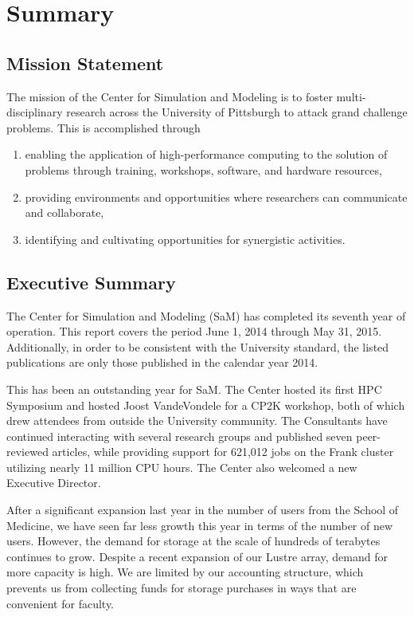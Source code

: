 \chapter{Summary}
\section{Mission Statement}

The mission of the Center for Simulation and Modeling is to foster multi-disciplinary research across the University of Pittsburgh to attack grand
challenge problems.  This is accomplished through

\begin{enumerate}
    \item enabling the application of high-performance computing to the
	  solution of problems through training, workshops, software, and
          hardware resources,
    \item providing environments and opportunities where researchers can
          communicate and collaborate,
    \item identifying and cultivating opportunities for synergistic activities.
\end{enumerate}


\section{Executive Summary}

The Center for Simulation and Modeling (SaM) has completed its seventh year of
operation.  This report covers the period June 1, 2014 through May 31, 2015.
Additionally, in order to be consistent with the University standard, the
listed publications are only those published in the calendar year 2014.

This has been an outstanding year for SaM.  The Center hosted its first HPC
Symposium and hosted Joost VandeVondele for a CP2K workshop, both of which
drew attendees from outside the University community.  The Consultants have
continued interacting with several research groups and published seven
peer-reviewed articles, while providing support for 621,012 jobs on the Frank
cluster utilizing nearly 11 million CPU hours.  The Center also welcomed a new
Executive Director.

After a significant expansion last year in the number of users from the School
of Medicine, we have seen far less growth this year in terms of the number of
new users.  However, the demand for storage at the scale of hundreds of
terabytes continues to grow.  Despite a recent expansion of our Lustre array,
demand for more capacity is high.  We are limited by our accounting structure,
which prevents us from collecting funds for storage purchases in ways that are
convenient for faculty.

